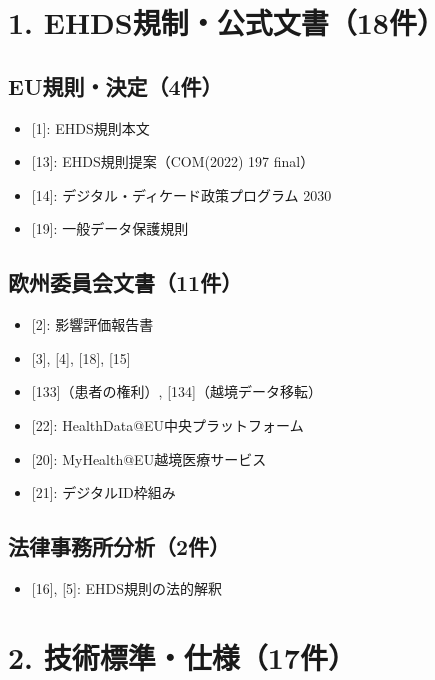 \documentclass[
  a4paper,
  a4paper,
  11pt]{ltjsbook}
\providecommand{\tightlist}{%
  \setlength{\itemsep}{0pt}\setlength{\parskip}{0pt}}
\begin{document}
\section{1.
EHDS規制・公式文書（18件）}\label{ehdsux898fux5236ux516cux5f0fux6587ux66f818ux4ef6}

\subsection{EU規則・決定（4件）}\label{euux898fux5247ux6c7aux5b9a4ux4ef6}

\begin{itemize}
\tightlist
\item
  {[}1{]}: EHDS規則本文
\item
  {[}13{]}: EHDS規則提案（COM(2022) 197 final）
\item
  {[}14{]}: デジタル・ディケード政策プログラム 2030
\item
  {[}19{]}: 一般データ保護規則
\end{itemize}

\subsection{欧州委員会文書（11件）}\label{ux6b27ux5ddeux59d4ux54e1ux4f1aux6587ux66f811ux4ef6}

\begin{itemize}
\tightlist
\item
  {[}2{]}: 影響評価報告書
\item
  {[}3{]}, {[}4{]}, {[}18{]}, {[}15{]}
\item
  {[}133{]}（患者の権利）, {[}134{]}（越境データ移転）
\item
  {[}22{]}: HealthData@EU中央プラットフォーム
\item
  {[}20{]}: MyHealth@EU越境医療サービス
\item
  {[}21{]}: デジタルID枠組み
\end{itemize}

\subsection{法律事務所分析（2件）}\label{ux6cd5ux5f8bux4e8bux52d9ux6240ux5206ux67902ux4ef6}

\begin{itemize}
\tightlist
\item
  {[}16{]}, {[}5{]}: EHDS規則の法的解釈
\end{itemize}

\section{2.
技術標準・仕様（17件）}\label{ux6280ux8853ux6a19ux6e96ux4ed5ux69d817ux4ef6}
\end{document}
